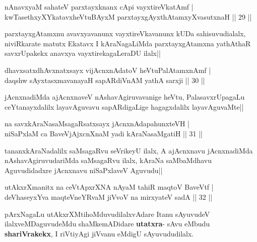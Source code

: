 \begin{shl}
nAnavxyaM sahateV parxtayxknanx cApi vayxtireVkatAmf |\\
kwTasethxyXYkatavxheVtuBAyxM parxtayxgAyxthAtamxyXvasutxnaH \hfill || 29 ||
\end{shl}

\begin{artha}
parxtayxgAtamxnu avavxyavanunx vayxtireVkavanunx kUDa sahisuvudialalx, niviRkarate matutx Ekatavx I kAraNagaLiMda parxtayxgAtamxna yathAthaR savxrUpakekx anavxya vayxtirekagaLeraDU ilalx||
\end{artha}


\begin{shl}
dhavxsatxdhAvxnatxsayx vijAcnxnAdatoV heVtuPalAtamxnAmf |\\
daqshw sAyxtasxmavanayaH sapARdiVnAM yathA sarxji \hfill || 30 ||
\end{shl}

\begin{artha}
jAcnxnadiMda ajAcnxnaveV nAshavAgiruvavanige heVtu, PalasavxrUpagaLu ceYtanayxdalilx 
layavAguvavu sapARdigaLige hagagxdalilx layavAguvaMte||
\end{artha}

\begin{shl}
na savxkAraNasaMsagaRsatxsayx jAcnxnAdapahunxteVH |\\
niSaPxlaM ca BaveVjAjxcnXnaM yadi kAraNasaMgatiH \hfill || 31 ||
\end{shl}

\begin{artha}
tananxkAraNadalilx saMsagaRvu seVrikeyU ilalx, A  ajAcnxnavu jAcnxnadiMda 
nAshavAgiruvudariMda saMsagaRvu ilalx, kAraNa saMbaMdhavu Aguvudidadxre jAcnxnavu 
niSaPxlaveV Aguvudu||
\end{artha}

\begin{shl}
utAkxrXmanitx na ceVtApxrXNA nAyaM tahiR maqtoV BaveVtf |\\
deVhaseyxYva maqteVneYRvaM jiVvoV na mirxyateV sadA \hfill || 32 ||
\end{shl}

\begin{artha}
pArxNagaLu utAkxrXMtihoMduvudilalxvAdare Itanu sAyuvudeV ilalxveMDaguvudeMdu shaMkemADidare \textbf{utatxra}- sAvu eMbudu \textbf{shariVrakekx}, I riVtiyAgi jiVvanu eMdigU sAyuvududilalx. 
\end{artha}

